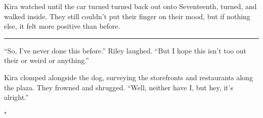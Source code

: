 Kira watched until the car turned turned back out onto Seventeenth, turned, and walked inside. They still couldn't put their finger on their mood, but if nothing else, it felt more positive than before.

\begin{center}\rule{0.5\linewidth}{0.5pt}\end{center}

``So, I've never done this before.'' Riley laughed. ``But I hope this isn't too out their or weird or anything.''

Kira clomped alongside the dog, surveying the storefronts and restaurants along the plaza. They frowned and shrugged. ``Well, neither have I, but hey, it's alright.''

"
